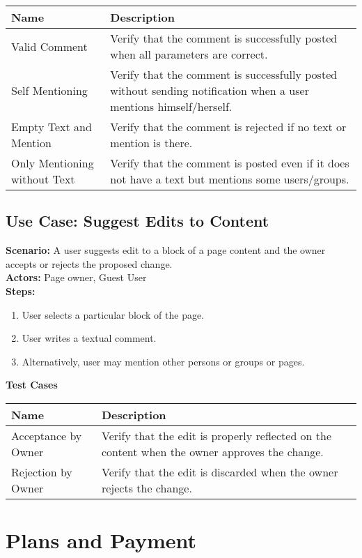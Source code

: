 \documentclass{article}
\begin{document}
            \begin{longtable}{|p{}|p{}|}
            \hline
            \textbf{Name} & \textbf{Description} \\
            \hline
            Valid Comment & Verify that the comment is successfully posted when all parameters are correct. \\
\hline
Self Mentioning & Verify that the comment is successfully posted without sending notification when a user mentions himself/herself. \\
\hline
Empty Text and Mention & Verify that the comment is rejected if no text or mention is there. \\
\hline
Only Mentioning without Text & Verify that the comment is posted even if it does not have a text but mentions some users/groups. \\
\hline
\end{longtable}\subsection{\textbf{Use Case: Suggest Edits to Content}}
\textbf{Scenario:} A user suggests edit to a block of a page content and the owner accepts or rejects the proposed change.\\
\textbf{Actors:} Page owner, Guest User\\
\textbf{Steps:}
\begin{enumerate}
\item User selects a particular block of the page.
\item User writes a textual comment.
\item Alternatively, user may mention other persons or groups or pages.
\end{enumerate}
\textbf{Test Cases}

            \begin{longtable}{|p{}|p{}|}
            \hline
            \textbf{Name} & \textbf{Description} \\
            \hline
            Acceptance by Owner & Verify that the edit is properly reflected on the content when the owner approves the change. \\
\hline
Rejection by Owner & Verify that the edit is discarded when the owner rejects the change. \\
\hline
\end{longtable}\section{\textbf{Plans and Payment}}
\end{document}

